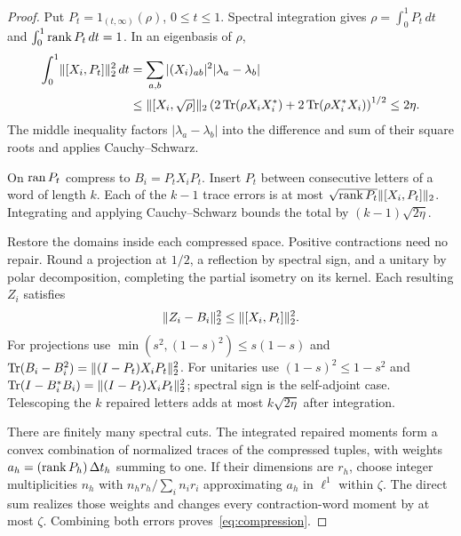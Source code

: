 \begin{proof}
Put $P_t=1_{(t,\infty)}(\rho)$, $0\le t\le1$. Spectral integration gives $\rho=\int_0^1P_t\,dt$ and $\int_0^1\operatorname{rank} P_t\,dt=1$. In an eigenbasis of $\rho$,
\begin{align*}
 \int_0^1\lVert[X_i,P_t]\rVert_2^2\,dt
 &=\sum_{a,b}|(X_i)_{ab}|^2|\lambda_a-\lambda_b|\\
 &\le\lVert[X_i,\sqrt\rho]\rVert_2
 \left(2\operatorname{Tr}(\rho X_iX_i^*)+2\operatorname{Tr}(\rho X_i^*X_i)\right)^{1/2}
 \le2\eta.
\end{align*}
The middle inequality factors $|\lambda_a-\lambda_b|$ into the difference and sum of their square roots and applies Cauchy--Schwarz.

On $\operatorname{ran} P_t$ compress to $B_i=P_tX_iP_t$. Insert $P_t$ between consecutive letters of a word of length $k$. Each of the $k-1$ trace errors is at most $\sqrt{\operatorname{rank} P_t}\lVert[X_i,P_t]\rVert_2$. Integrating and applying Cauchy--Schwarz bounds the total by $(k-1)\sqrt{2\eta}$.

Restore the domains inside each compressed space. Positive contractions need no repair. Round a projection at $1/2$, a reflection by spectral sign, and a unitary by polar decomposition, completing the partial isometry on its kernel. Each resulting $Z_i$ satisfies
\[
 \lVert Z_i-B_i\rVert_2^2\le\lVert[X_i,P_t]\rVert_2^2.
\]
For projections use $\min(s^2,(1-s)^2)\le s(1-s)$ and $\operatorname{Tr}(B_i-B_i^2)=\lVert(I-P_t)X_iP_t\rVert_2^2$. For unitaries use $(1-s)^2\le1-s^2$ and $\operatorname{Tr}(I-B_i^*B_i)=\lVert(I-P_t)X_iP_t\rVert_2^2$; spectral sign is the self-adjoint case. Telescoping the $k$ repaired letters adds at most $k\sqrt{2\eta}$ after integration.

There are finitely many spectral cuts. The integrated repaired moments form a convex combination of normalized traces of the compressed tuples, with weights $a_h=(\operatorname{rank} P_h)\,\Delta t_h$ summing to one. If their dimensions are $r_h$, choose integer multiplicities $n_h$ with $n_hr_h/\sum_in_ir_i$ approximating $a_h$ in $\ell^1$ within $\zeta$. The direct sum realizes those weights and changes every contraction-word moment by at most $\zeta$. Combining both errors proves~\eqref{eq:compression}.
\end{proof}

